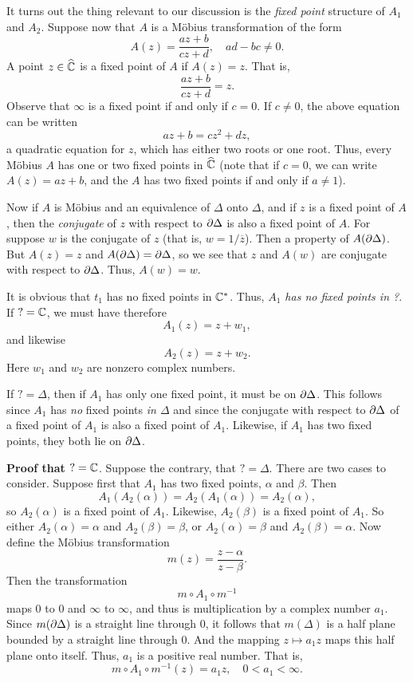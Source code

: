 \documentclass[a4paper,11pt]{article}
\begin{document}
It turns out the thing relevant to our discussion is the \emph{fixed
  point} structure of $A_1$ and $A_2$.  Suppose now that $A$ is a
M\"obius transformation of the form
$$
A(z) = \frac{az+b}{cz+d},\quad ad-bc \ne 0.
$$
A point $z \in \widehat{{\mathbb C}}$ is a fixed point of $A$ if $A(z) = z$.
That is,
$$
\frac{az+b}{cz+d} = z.
$$
Observe that $\infty$ is a fixed point if and only if $c = 0$.  If
$c\ne 0$, the above equation can be written
$$
az + b = cz^2 + dz,
$$
a quadratic equation for $z$, which has either two roots or one root.
Thus, every M\"obius $A$ has one or two fixed points in
$\widehat{{\mathbb C}}$ (note that if $c = 0$, we can write $A(z) = az + b$,
and the $A$ has two fixed points if and only if $a \ne 1$).

Now if $A$ is M\"obius and an equivalence of $\Delta$ onto $\Delta$,
and if $z$ is a fixed point of $A$, then the \emph{conjugate} of $z$
with respect to $\partial \Delta$ is also a fixed point of $A$.  For suppose
$w$ is the conjugate of $z$ (that is, $w = 1/\overline{z}$).  Then a
property of $A(\partial \Delta)$.  But $A(z) = z$ and $A(\partial \Delta) = \partial
\Delta$, so we see that $z$ and $A(w)$ are conjugate with respect to
$\partial \Delta$.  Thus, $A(w) = w$. 

It is obvious that $t_1$ has no fixed points in ${\mathbb C}^*$.  Thus,
\emph{$A_1$ has no fixed points in ?}.  If $? = {\mathbb C}$, we must have
therefore
$$
A_1(z) = z + w_1,
$$
and likewise
$$
A_2(z) = z + w_2.
$$
Here $w_1$ and $w_2$ are nonzero complex numbers.

If $? = \Delta$, then if $A_1$ has only one fixed point, it must be on
$\partial \Delta$.  This follows since $A_1$ has \emph{no} fixed points
\emph{in $\Delta$} and since the conjugate with respect to $\partial \Delta$
of a fixed point of $A_1$ is also a fixed point of $A_1$.  Likewise,
if $A_1$ has two fixed points, they both lie on $\partial \Delta$.

\textbf{Proof that $? = {\mathbb C}$}.  Suppose the contrary, that $? =
\Delta$.  There are two cases to consider.  Suppose first that $A_1$
has two fixed points, $\alpha$ and $\beta$.  Then
$$
A_1(A_2(\alpha)) = A_2(A_1(\alpha)) = A_2(\alpha),
$$
so $A_2(\alpha)$ is a fixed point of $A_1$.  Likewise, $A_2(\beta)$ is
a fixed point of $A_1$.  So either $A_2(\alpha) = \alpha$ and
$A_2(\beta) = \beta$, or $A_2(\alpha) = \beta$ and $A_2(\beta) =
\alpha$.  Now define the M\"obius transformation
$$
m(z) = \frac{z-\alpha}{z-\beta}.
$$
Then the transformation
$$
m \circ A_1 \circ m^{-1}
$$
maps 0 to 0 and $\infty$ to $\infty$, and thus is multiplication by a
complex number $a_1$.  Since $m(\partial \Delta)$ is a straight line through
0, it follows that $m(\Delta)$ is a half plane bounded by a straight
line through 0.  And the mapping $z \mapsto a_1 z$ maps this half
plane onto itself.  Thus, $a_1$ is a positive real number.  That is,
$$
m \circ A_1 \circ m^{-1}(z) = a_1 z, \quad 0 < a_1 < \infty.
$$
\end{document}
